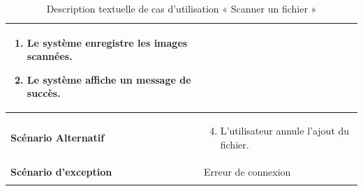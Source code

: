 \begin{longtable}{|p{5cm}|p{10cm}|}
\begin{enumerate}
    \item Le système enregistre les images scannées.
    \item Le système affiche un message de succès.
\end{enumerate}\\
\hline
\textbf{Scénario Alternatif}&
\vspace{-\baselineskip}
\begin{enumerate}
    \setcounter{enumi}{3}
    \item L'utilisateur annule l'ajout du fichier.
\end{enumerate}\\
\hline
\textbf{Scénario d'exception}&Erreur de connexion\\
\hline
\caption{Description textuelle de cas d'utilisation « Scanner un fichier »}
\label{tab:DescriptionTextuelleDeCasDUtilisationScannerUnFichier}

\end{longtable}



    
    
    



